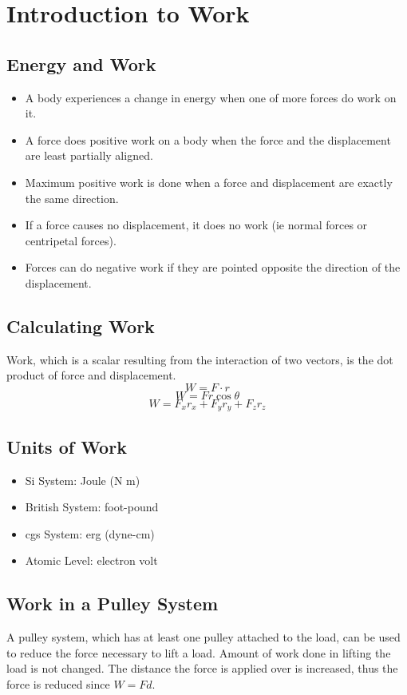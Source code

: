 \section{Introduction to Work}

\subsection{Energy and Work}
\begin{itemize}
	\item A body experiences a change in energy when one of more forces do work on it. 
	\item A force does positive work on a body when the force and the displacement are least partially aligned. 
	\item Maximum positive work is done when a force and displacement are exactly the same direction. 
	\item If a force causes no displacement, it does no work (ie normal forces or centripetal forces). 
	\item Forces can do negative work if they are pointed opposite the direction of the displacement.
\end{itemize}

\subsection{Calculating Work}
Work, which is a scalar resulting from the interaction of two vectors, is the dot product of force and displacement.
\[W=F\cdot r\]
\[W=Fr \cos \theta\]
\[W=F_xr_x+F_yr_y+F_zr_z\]

\subsection{Units of Work}
\begin{itemize}
	\item Si System: Joule (N m)
	\item British System: foot-pound
	\item cgs System: erg (dyne-cm)
	\item Atomic Level: electron volt
\end{itemize}

\subsection{Work in a Pulley System}
A pulley system, which has at least one pulley attached to the load, can be used to reduce the force necessary to lift a load. Amount of work done in lifting the load is not changed. The distance the force is applied over is increased, thus the force is reduced since $W=Fd$.

